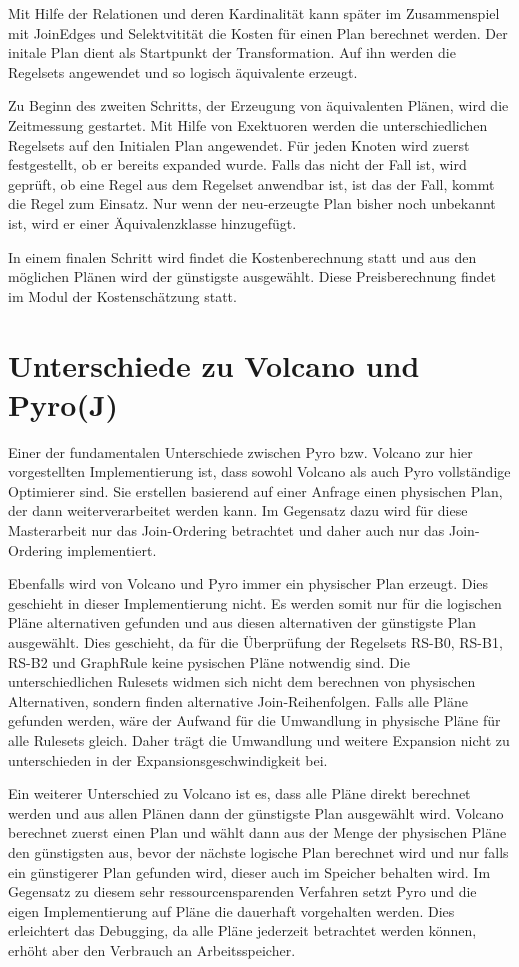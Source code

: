 Mit Hilfe der Relationen und deren Kardinalität kann später im Zusammenspiel mit JoinEdges und Selektvitität die Kosten für einen Plan berechnet werden. Der initale Plan dient als Startpunkt der Transformation. Auf ihn werden die Regelsets angewendet und so logisch äquivalente erzeugt.

Zu Beginn des zweiten Schritts, der Erzeugung von äquivalenten Plänen, wird die Zeitmessung gestartet.  Mit Hilfe von Exektuoren werden die unterschiedlichen Regelsets auf den Initialen Plan angewendet. Für jeden Knoten wird zuerst festgestellt, ob er bereits expanded wurde. Falls das nicht der Fall ist, wird geprüft, ob eine Regel aus dem Regelset anwendbar ist, ist das der Fall, kommt die Regel zum Einsatz. Nur wenn der neu-erzeugte Plan bisher noch unbekannt ist, wird er einer Äquivalenzklasse hinzugefügt.

In einem finalen Schritt wird findet die Kostenberechnung statt und aus den möglichen Plänen wird der günstigste ausgewählt. Diese Preisberechnung findet im Modul der Kostenschätzung statt.


\section{Unterschiede zu Volcano und Pyro(J)}

Einer der fundamentalen Unterschiede zwischen Pyro bzw. Volcano zur hier vorgestellten Implementierung ist, dass sowohl Volcano als auch Pyro vollständige Optimierer sind. Sie erstellen basierend auf einer Anfrage einen physischen Plan, der dann weiterverarbeitet werden kann. Im Gegensatz dazu wird für diese Masterarbeit nur das Join-Ordering betrachtet und daher auch nur das Join-Ordering implementiert.


Ebenfalls wird von Volcano und Pyro immer ein physischer Plan erzeugt. Dies geschieht in dieser Implementierung nicht. Es werden somit nur für die logischen Pläne alternativen gefunden und aus diesen alternativen der günstigste Plan ausgewählt. Dies geschieht, da für die Überprüfung der Regelsets RS-B0, RS-B1, RS-B2 und GraphRule keine pysischen Pläne notwendig sind. Die unterschiedlichen Rulesets widmen sich nicht dem berechnen von physischen Alternativen, sondern finden alternative Join-Reihenfolgen. Falls alle Pläne gefunden werden, wäre der Aufwand für die Umwandlung in physische Pläne für alle Rulesets gleich. Daher trägt die Umwandlung und weitere Expansion nicht zu unterschieden in der Expansionsgeschwindigkeit bei.

Ein weiterer Unterschied zu Volcano ist es, dass alle Pläne direkt berechnet werden und aus allen Plänen dann der günstigste Plan ausgewählt wird. Volcano berechnet zuerst einen Plan und wählt dann aus der Menge der physischen Pläne den günstigsten aus, bevor der nächste logische Plan berechnet wird und nur falls ein günstigerer Plan gefunden wird, dieser auch im Speicher behalten wird. Im Gegensatz zu diesem sehr ressourcensparenden Verfahren setzt Pyro und die eigen Implementierung auf Pläne die dauerhaft vorgehalten werden. Dies erleichtert das Debugging, da alle Pläne jederzeit betrachtet werden können, erhöht aber den Verbrauch an Arbeitsspeicher.

